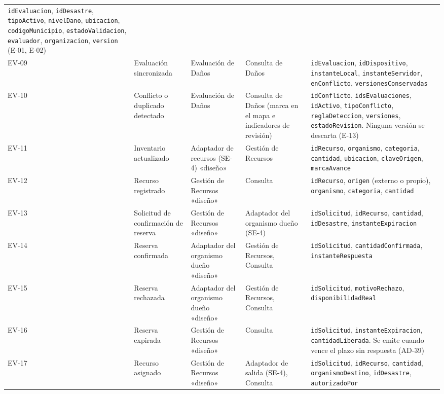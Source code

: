 \documentclass[11pt,letterpaper]{article}
\begin{document}
\begin{longtable}{L{1.1cm} L{2.7cm} L{2.4cm} L{2.9cm} L{6.2cm}}
\texttt{idEvaluacion}, \texttt{idDesastre}, \texttt{tipoActivo}, \texttt{nivelDano},
\texttt{ubicacion}, \texttt{codigoMunicipio}, \texttt{estadoValidacion}, \texttt{evaluador},
\texttt{organizacion}, \texttt{version} (E-01, E-02) \\
EV-09 & Evaluación sincronizada & Evaluación de Daños & Consulta de Daños & \texttt{idEvaluacion},
\texttt{idDispositivo}, \texttt{instanteLocal}, \texttt{instanteServidor}, \texttt{enConflicto},
\texttt{versionesConservadas} \\
EV-10 & Conflicto o duplicado detectado & Evaluación de Daños & Consulta de Daños (marca en el mapa
e indicadores de revisión) & \texttt{idConflicto}, \texttt{idsEvaluaciones}, \texttt{idActivo},
\texttt{tipoConflicto}, \texttt{reglaDeteccion}, \texttt{versiones}, \texttt{estadoRevision}.
Ninguna versión se descarta (E-13) \\
EV-11 & Inventario actualizado & Adaptador de recursos (SE-4) «diseño» & Gestión de Recursos &
\texttt{idRecurso}, \texttt{organismo}, \texttt{categoria}, \texttt{cantidad}, \texttt{ubicacion},
\texttt{claveOrigen}, \texttt{marcaAvance} \\
EV-12 & Recurso registrado & Gestión de Recursos «diseño» & Consulta & \texttt{idRecurso},
\texttt{origen} (externo o propio), \texttt{organismo}, \texttt{categoria}, \texttt{cantidad} \\
EV-13 & Solicitud de confirmación de reserva & Gestión de Recursos «diseño» & Adaptador del
organismo dueño (SE-4) & \texttt{idSolicitud}, \texttt{idRecurso}, \texttt{cantidad},
\texttt{idDesastre}, \texttt{instanteExpiracion} \\
EV-14 & Reserva confirmada & Adaptador del organismo dueño «diseño» & Gestión de Recursos, Consulta
& \texttt{idSolicitud}, \texttt{cantidadConfirmada}, \texttt{instanteRespuesta} \\
EV-15 & Reserva rechazada & Adaptador del organismo dueño «diseño» & Gestión de Recursos, Consulta &
\texttt{idSolicitud}, \texttt{motivoRechazo}, \texttt{disponibilidadReal} \\
EV-16 & Reserva expirada & Gestión de Recursos «diseño» & Consulta & \texttt{idSolicitud},
\texttt{instanteExpiracion}, \texttt{cantidadLiberada}. Se emite cuando vence el plazo sin
respuesta (AD-39) \\
EV-17 & Recurso asignado & Gestión de Recursos «diseño» & Adaptador de salida (SE-4), Consulta &
\texttt{idSolicitud}, \texttt{idRecurso}, \texttt{cantidad}, \texttt{organismoDestino},
\texttt{idDesastre}, \texttt{autorizadoPor} \\

\end{longtable}
\end{document}
